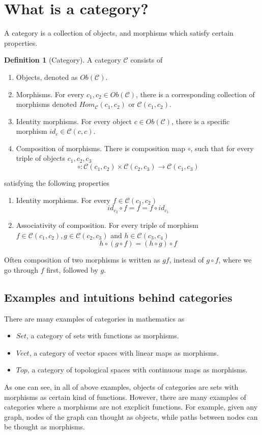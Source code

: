 \documentclass{report}
\theoremstyle{definition}
\newtheorem{definition}{Definition}
\begin{document}
\section*{What is a category?}
A category is a collection of objects, and morphisms which satisfy certain properties.
\begin{definition}[Category]
	A category $\mathcal{C}$ consists of
	\begin{enumerate}
		\item Objects, denoted as $Ob(\mathcal{C})$.
		\item Morphisms. For every $c_1,c_2\in Ob(\mathcal{C})$, there is a corresponding collection of morphisms denoted $Hom_{\mathcal{C}}(c_1,c_2)$ or $\mathcal{C}(c_1,c_2)$. 
		\item Identity morphisms. For every object $c\in Ob(\mathcal{C})$, there is a specific morphism $id_c\in \mathcal{C}(c,c)$.
		\item Composition of morphisms. There is composition map $\circ$, such that for every triple of objects $c_1,c_2,c_3$
		\[
		\circ: \mathcal{C}(c_1,c_2)\times \mathcal{C}(c_2,c_3) \to \mathcal{C}(c_1,c_3)
		\]
	\end{enumerate}
	satisfying the following properties
	\begin{enumerate}[label=(\alph*)]
		\item Identity morphisms. For every $f\in \mathcal{C}(c_1,c_2)$
		\[
		id_{c_2}\circ f = f = f\circ id_{c_1}
		\]
		\item Associativity of composition. For every triple of morphism $f\in \mathcal{C}(c_1,c_2), g\in\mathcal{C}(c_2,c_3)$ and $h\in\mathcal{C}(c_3,c_4)$
		\[
		h\circ (g\circ f) = (h\circ g)\circ f
		\]
	\end{enumerate}
	Often composition of two morphisms is written as $gf$, instead of $g\circ f$, where we go through $f$ first, followed by $g$. 
\end{definition}

\subsection*{Examples and intuitions behind categories}
There are many examples of categories in mathematics as 
\begin{itemize}
	\item $Set$, a category of sets with functions as morphisms.
	\item $Vect$, a category of vector spaces with linear maps as morphisms.
	\item $Top$, a category of topological spaces with continuous maps as morphisms.
\end{itemize}
As one can see, in all of above examples, objects of categories are sets with morphisms as certain kind of functions. However, there are many examples of categories where a morphisms are not excplicit functions. For example, given any graph, nodes of the graph can thought as objects, while paths between nodes can be thought as morphisms. 
\end{document}
